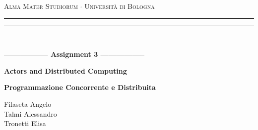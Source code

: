\begin{titlepage}
	\begin{center}
		{{\Large{\textsc{Alma Mater Studiorum $\cdot$ Università di Bologna}}}}
		\rule[0.1cm]{15.8cm}{0.1mm}
		\rule[0.5cm]{15.8cm}{0.6mm}
		\\
		\vspace{3mm}
	\end{center}
	\vspace{2mm}
	\begin{center}
		{\LARGE{\bf{----------------- Assignment 3 -----------------}}}
		\vspace{5mm} \par \noindent
		{\Huge{\bf{Actors and Distributed Computing}}}
		\vspace{10mm} \par \noindent
		{\LARGE \textbf{Programmazione Concorrente e Distribuita}}
		\vspace{15mm} \par \noindent
		{\Large Filaseta Angelo\\
			Talmi Alessandro\\
			Tronetti Elisa\\}
	\end{center}
	\hfill
	\vspace{40mm}
\end{titlepage}
